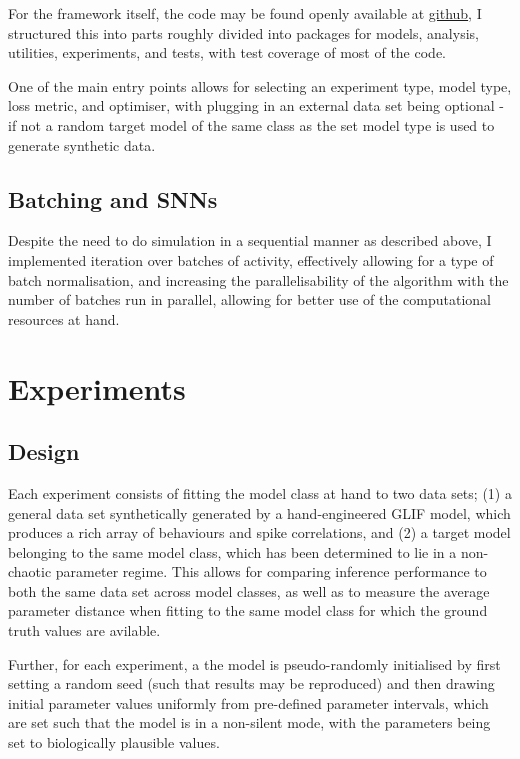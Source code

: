 \documentclass[mphil,deptreport,ai]{infthesis} %
\begin{document}
For the framework itself, the code may be found openly available at \href{https://github.com/williampeer/snn_inference}{github}, I structured this into parts roughly divided into packages for models, analysis, utilities, experiments, and tests, with test coverage of most of the code.

One of the main entry points allows for selecting an experiment type, model type, loss metric, and optimiser, with plugging in an external data set being optional - if not a random target model of the same class as the set model type is used to generate synthetic data.


\subsection{Batching and SNNs}

Despite the need to do simulation in a sequential manner as described above, I implemented iteration over batches of activity, effectively allowing for a type of batch normalisation, and increasing the parallelisability of the algorithm with the number of batches run in parallel, allowing for better use of the computational resources at hand.


\section{Experiments}

\subsection{Design}

Each experiment consists of fitting the model class at hand to two data sets; (1) a general data set synthetically generated by a hand-engineered GLIF model, which produces a rich array of behaviours and spike correlations, and (2) a target model belonging to the same model class, which has been determined to lie in a non-chaotic parameter regime.
This allows for comparing inference performance to both the same data set across model classes, as well as to measure the average parameter distance when fitting to the same model class for which the ground truth values are avilable.

Further, for each experiment, a the model is pseudo-randomly initialised by first setting a random seed (such that results may be reproduced) and then drawing initial parameter values uniformly from pre-defined parameter intervals, which are set such that the model is in a non-silent mode, with the parameters being set to biologically plausible values.
\end{document}

